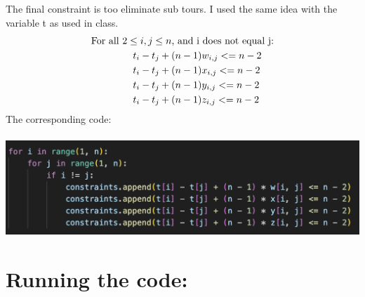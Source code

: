 \documentclass[12pt]{extarticle}
\begin{document}
The final constraint is too eliminate sub tours. I used the same idea with the variable t as used in class.
\begin{align*}
&\text{For all } 2 \leq i, j \leq n \text{, and i does not equal j:} \\
&\hspace{1.5cm}t_i - t_j + (n-1)w_{i,j} <= n-2 \\
&\hspace{1.5cm}t_i - t_j + (n-1)x_{i,j} <= n-2 \\
&\hspace{1.5cm}t_i - t_j + (n-1)y_{i,j} <= n-2 \\
&\hspace{1.5cm}t_i - t_j + (n-1)z_{i,j} <= n-2 \\
\end{align*}
The corresponding code: \\ \\
\includegraphics{images/constraints6.png} \\

\section*{\small Running the code:}
\end{document}
